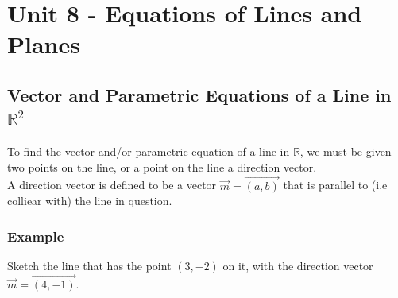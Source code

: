\documentclass{article}
\begin{document}
\newpage
\section{Unit 8 - Equations of Lines and Planes }
\subsection{Vector and Parametric Equations of a Line in $\mathbb{R}^2$}
To find the vector and/or parametric equation of a line in $\mathbb{R}$, we must be given two points on the line, or a point on the line a direction vector.\\
A direction vector is defined to be a vector $\vec{m}=\overrightarrow{(a,b)}$ that is parallel to (i.e colliear with) the line in question.

\subsubsection*{Example}
\begin{minipage}{0.45\textwidth}
    Sketch the line that has the point $(3,-2)$ on it, with the direction vector $\vec{m}=\overrightarrow{(4,-1)}$.
\end{minipage}%
\begin{minipage}{0.45\textwidth}
    \begin{center}
    \end{center}
\end{minipage}
\end{document}
